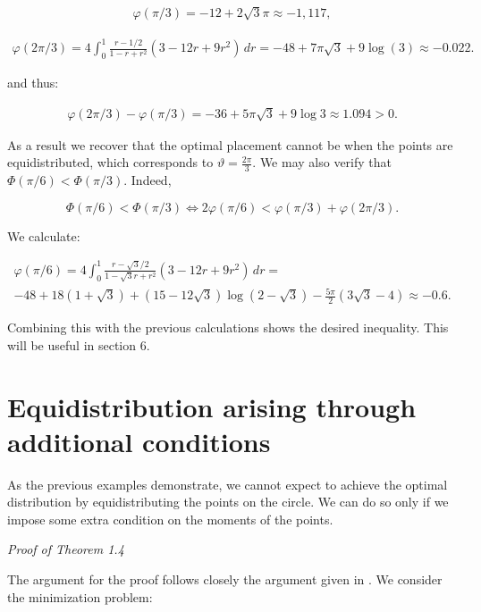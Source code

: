 \documentclass{amsart}[11pt]
\newcommand{\vphi}{\varphi}
\newcommand{\vth}{\vartheta}
\theoremstyle{definition}
\begin{document}
\begin{gather*}
    \vphi(\pi/3) = -12 +2\sqrt{3} \pi \approx -1,117,
\end{gather*}

\begin{gather*}
    \vphi(2\pi/3) = 4 \int_0^1 \frac{r-1/2}{1-r+r^2} (3 - 12r + 9r^2)\,dr = -48 + 7\pi\sqrt{3} + 9\log(3) \approx -0.022.
\end{gather*}

and thus:

\begin{gather*}
  \vphi(2\pi/3)   - \vphi(\pi/3) = -36 + 5\pi\sqrt{3} +9\log3 \approx 1.094 > 0.
\end{gather*}

As a result we recover that the optimal placement cannot be when the points are equidistributed, which corresponds to $\vth = \frac{2\pi}{3}$. We may also verify that $\Phi(\pi/6) < \Phi(\pi/3)$. Indeed,

\[
\Phi(\pi/6) < \Phi(\pi/3) \iff 2 \vphi(\pi/6) < \vphi(\pi/3) + \vphi(2\pi/3) .
\]

We calculate:

\begin{align*}
    \vphi(\pi/6) = 4 \int_0^1 \frac{r-\sqrt{3}/2}{1-\sqrt{3}r+r^2} (3 - 12r + 9r^2)\,dr =   \\
    -48 + 18(1 + \sqrt{3}) + (15-12\sqrt{3})\log(2-\sqrt{3})-\frac{5\pi}{2}(3\sqrt{3}-4) \approx -0.6.
\end{align*}

Combining this with the previous calculations shows the desired inequality. This will be useful in section 6.
\vspace{2mm}


\section{Equidistribution arising through additional conditions}

As the previous examples demonstrate, we cannot expect to achieve the optimal distribution by equidistributing the points on the circle. We can do so only if we impose some extra condition on the moments of the points. 

\vspace{2mm}

\textit{Proof of Theorem 1.4}

The argument for the proof follows closely the argument given in \cite{Abakumov2020}. We consider the minimization problem:
\end{document}
